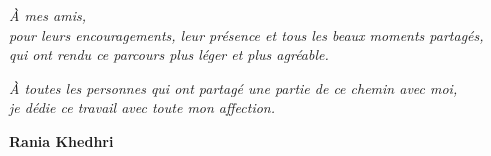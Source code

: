 \vspace{0.8cm}

\begin{center}
\textit{
À mes amis,\\
pour leurs encouragements, leur présence et tous les beaux moments partagés,\\
qui ont rendu ce parcours plus léger et plus agréable.
}
\end{center}

\vspace{0.8cm}

\begin{center}
\textit{
À toutes les personnes qui ont partagé une partie de ce chemin avec moi,\\
je dédie ce travail avec toute mon affection.
}
\end{center}

\vspace{0.8cm}

\begin{flushright}
\textbf{Rania Khedhri}
\end{flushright}